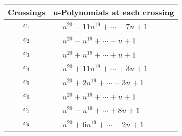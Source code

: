 \documentclass[1p]{elsarticle_modified}
\theoremstyle{definition}
\begin{document}
\begin{tabular}{m{50pt}|m{274pt}}
Crossings & \hspace{64pt}u-Polynomials at each crossing \\
\hline $$\begin{aligned}c_{1}\end{aligned}$$&$\begin{aligned}
&u^{20}-11 u^{19}+\cdots-7 u+1
\end{aligned}$\\
\hline $$\begin{aligned}c_{2}\end{aligned}$$&$\begin{aligned}
&u^{20}- u^{19}+\cdots- u+1
\end{aligned}$\\
\hline $$\begin{aligned}c_{3}\end{aligned}$$&$\begin{aligned}
&u^{20}+u^{19}+\cdots+u+1
\end{aligned}$\\
\hline $$\begin{aligned}c_{4}\end{aligned}$$&$\begin{aligned}
&u^{20}+11 u^{18}+\cdots+3 u+1
\end{aligned}$\\
\hline $$\begin{aligned}c_{5}\end{aligned}$$&$\begin{aligned}
&u^{20}+2 u^{19}+\cdots-3 u+1
\end{aligned}$\\
\hline $$\begin{aligned}c_{6}\end{aligned}$$&$\begin{aligned}
&u^{20}+u^{19}+\cdots+u+1
\end{aligned}$\\
\hline $$\begin{aligned}c_{7}\end{aligned}$$&$\begin{aligned}
&u^{20}- u^{19}+\cdots+8 u+1
\end{aligned}$\\
\hline $$\begin{aligned}c_{8}\end{aligned}$$&$\begin{aligned}
&u^{20}+6 u^{19}+\cdots-2 u+1
\end{aligned}$\\

\end{tabular}
\end{document}
